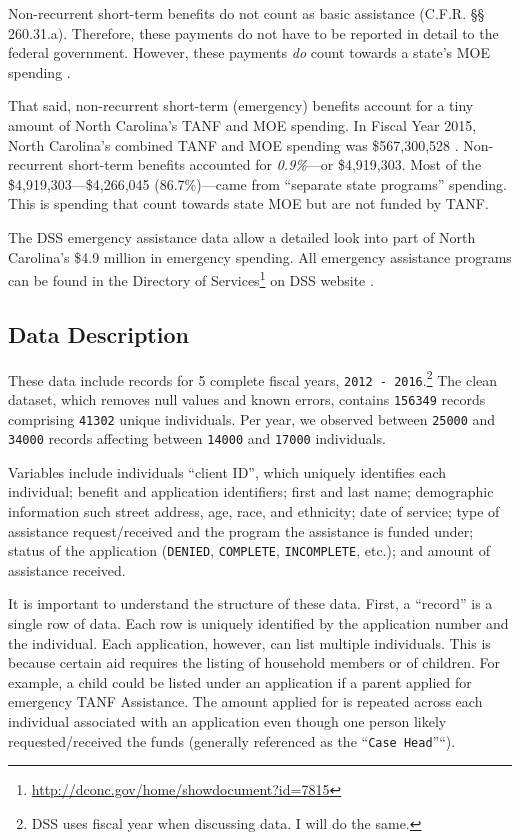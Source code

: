 \documentclass[12pt,letterpaperpaper,]{book}
\renewcommand{\href}[2]{#2\footnote{\url{#1}}}
\begin{document}
Non-recurrent short-term benefits do not count as basic assistance
(C.F.R. §§ 260.31.a). Therefore, these payments do not have to be
reported in detail to the federal government. However, these payments
\emph{do} count towards a state's MOE spending \citep{schott_how_2015}.

That said, non-recurrent short-term (emergency) benefits account for a
tiny amount of North Carolina's TANF and MOE spending. In Fiscal Year
2015, North Carolina's combined TANF and MOE spending was \$567,300,528
\citep{us_dhhs_tanf_2015-1}. Non-recurrent short-term benefits accounted
for \emph{0.9\%}---or \$4,919,303. Most of the \$4,919,303---\$4,266,045
(86.7\%)---came from ``separate state programs'' spending. This is
spending that count towards state MOE but are not funded by TANF.

The DSS emergency assistance data allow a detailed look into part of
North Carolina's \$4.9 million in emergency spending. All emergency
assistance programs can be found in the
\href{http://dconc.gov/home/showdocument?id=7815}{Directory of Services}
on DSS website
\citep{durham_county_department_of_social_services_directory_2016}.

\subsection*{Data Description}\label{data-description}

These data include records for 5 complete fiscal years,
\texttt{2012\ -\ 2016}.\footnote{DSS uses fiscal year when discussing
  data. I will do the same.} The clean dataset, which removes null
values and known errors, contains \texttt{156349} records comprising
\texttt{41302} unique individuals. Per year, we observed between
\texttt{25000} and \texttt{34000} records affecting between
\texttt{14000} and \texttt{17000} individuals.

Variables include individuals ``client ID'', which uniquely identifies
each individual; benefit and application identifiers; first and last
name; demographic information such street address, age, race, and
ethnicity; date of service; type of assistance request/received and the
program the assistance is funded under; status of the application
(\texttt{DENIED}, \texttt{COMPLETE}, \texttt{INCOMPLETE}, etc.); and
amount of assistance received.

It is important to understand the structure of these data. First, a
``record'' is a single row of data. Each row is uniquely identified by
the application number and the individual. Each application, however,
can list multiple individuals. This is because certain aid requires the
listing of household members or of children. For example, a child could
be listed under an application if a parent applied for emergency TANF
Assistance. The amount applied for is repeated across each individual
associated with an application even though one person likely
requested/received the funds (generally referenced as the
``\texttt{Case\ Head}''``).
\end{document}
